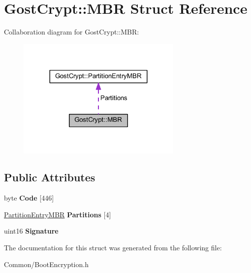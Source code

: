 \hypertarget{struct_gost_crypt_1_1_m_b_r}{}\section{Gost\+Crypt\+:\+:M\+BR Struct Reference}
\label{struct_gost_crypt_1_1_m_b_r}


Collaboration diagram for Gost\+Crypt\+:\+:M\+BR\+:
\nopagebreak
\begin{figure}[H]
\begin{center}
\leavevmode
\includegraphics[width=228pt]{struct_gost_crypt_1_1_m_b_r__coll__graph}
\end{center}
\end{figure}
\subsection*{Public Attributes}
\begin{DoxyCompactItemize}
\item 
\mbox{\label{struct_gost_crypt_1_1_m_b_r_a160e238a12bac377135e2ac02ef2995e}} 
byte {\bfseries Code} \mbox{[}446\mbox{]}
\item 
\mbox{\label{struct_gost_crypt_1_1_m_b_r_a92a60b2389c7ead7991633e51a0a2c7e}} 
\hyperlink{struct_gost_crypt_1_1_partition_entry_m_b_r}{Partition\+Entry\+M\+BR} {\bfseries Partitions} \mbox{[}4\mbox{]}
\item 
\mbox{\label{struct_gost_crypt_1_1_m_b_r_a4405b4cefd3b094d87dfe42e579ec6cf}} 
uint16 {\bfseries Signature}
\end{DoxyCompactItemize}


The documentation for this struct was generated from the following file\+:\begin{DoxyCompactItemize}
\item 
Common/Boot\+Encryption.\+h\end{DoxyCompactItemize}
